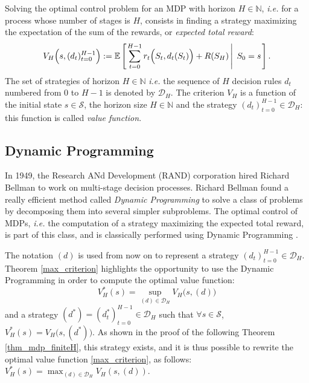 Solving the optimal control problem
for an MDP with horizon $H \in \mathbb{N}$,
\textit{i.e.} for a process whose number of stages is $H$,
consists in finding a strategy maximizing 
the expectation of the sum of the rewards, 
or \textit{expected total reward}: 
\begin{equation} 
\label{criterion} 
V_H \Big( s,(d_t)_{t=0}^{ H-1 } \Big) 
:= \mathbb{E} \left[ \left.  \sum_{t=0}^{H-1} r_t \Big( S_t,d_t(S_t) \Big) + R(S_H) \, \right| \left. \, S_0=s  \right. \right].
\end{equation} 
The set of strategies of horizon $H \in \mathbb{N}$ 
\textit{i.e.} the sequence of $H$ decision rules $d_t$
numbered from $0$ to $H-1$ is denoted by $\mathcal{D}_H$.
The criterion $V_H$ is a function of the initial state $s \in \mathcal{S}$, 
the horizon size $H \in \mathbb{N}$ 
and the strategy $(d_t)_{t=0}^{H-1} \in \mathcal{D}_H$: 
this function is called \textit{value function}. 
\subsection{Dynamic Programming}
\label{subsectionDP}
In 1949, the Research ANd Development (RAND) corporation 
hired Richard Bellman to work on multi-stage decision processes.
Richard Bellman found a really efficient method
called \textit{Dynamic Programming} \cite{bellman54}
to solve a class of problems by decomposing them 
into several simpler subproblems.
The optimal control of MDPs,
\textit{i.e.} the computation of a strategy
maximizing the expected total reward, is part of this class,
and is classically performed using Dynamic Programming \cite{puterman94}.

The notation $(d)$ is used from now on
to represent a strategy $(d_t)_{t=0}^{H-1} \in \mathcal{D}_H$.
Theorem \ref{max_criterion} highlights the opportunity 
to use the Dynamic Programming 
in order to compute the optimal value function:
\begin{equation}
\label{max_criterion} 
V^*_H(s)= \sup_{(d) \in \mathcal{D}_H}  V_H \Big( s,(d) \Big) 
\end{equation}
and a strategy $(d^*) = (d^*_t)_{t=0}^{H-1} \in \mathcal{D}_H$ 
such that $\forall s \in \mathcal{S}$, 
$V_H^*(s) = V_H \Big(s,(d^*)\Big)$.
As shown in the proof of the following Theorem \ref{thm_mdp_finiteH}, 
this strategy exists, and
it is thus possible to rewrite the optimal value function \ref{max_criterion},
as follows: $\displaystyle V^*_H(s)= \max_{(d) \in \mathcal{D}_H}  V_H(s,(d))$.  

